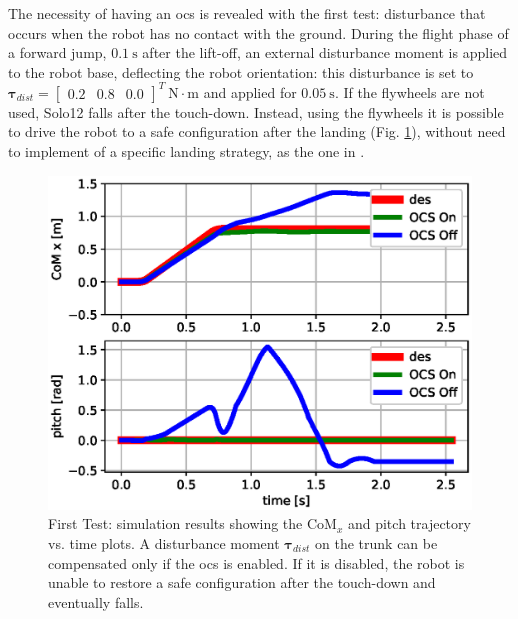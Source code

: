 \documentclass[letterpaper, 10 pt, conference]{ieeeconf}      %
\begin{document}
The necessity of having an \gls{ocs} is revealed with the first test: disturbance that occurs when the robot has no contact with the ground. 
During the flight phase of a forward jump, $0.1~\mathrm{s}$ after the lift-off, an external disturbance moment is applied to the robot base, deflecting the robot orientation: this disturbance is set to $\bm{\tau}_{dist} = \left[\begin{array}{ccc}
0.2 & 0.8 & 0.0
\end{array}
\right]^T \ \mathrm{N \cdot m}$ and applied for $0.05 \ \mathrm{s}$. 
If the flywheels are not used, Solo12 falls after the touch-down. Instead, 
using the flywheels %
it is possible to drive the robot to a safe configuration after the landing (Fig. \ref{fig:fw_jump}), without need to implement of a specific landing strategy, as the one in \cite{jeon2021real}.
\begin{figure}
	\centering
	\includegraphics[width=1\linewidth]{figures/fw_jump.eps}
	\caption{\small First Test: simulation results showing the $\mathrm{CoM}_x$ and pitch trajectory vs. time plots. A disturbance moment $\bm{\tau}_{dist}$ on the trunk can be compensated only if the \gls{ocs} is enabled. If it is disabled, the robot is unable to restore a safe configuration after the touch-down and eventually falls.}
	\label{fig:fw_jump}
\end{figure}
\end{document}
